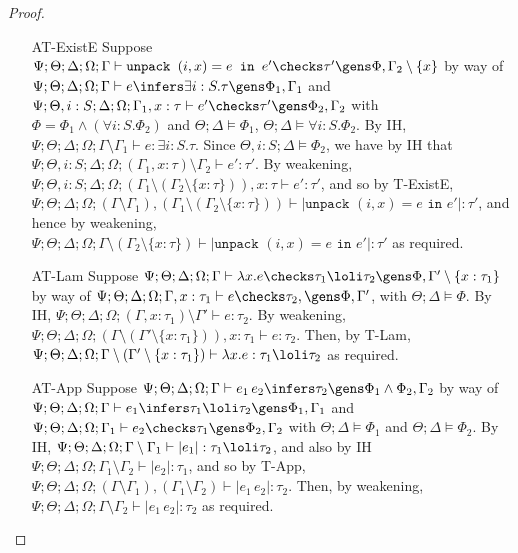 \begin{proof}
\begin{enumerate}
  \item[AT-ExistE] Suppose ${
\Psi ; \Theta ; \Delta ; \Omega ; \Gamma\vdash \texttt{unpack } (i,x) = e \texttt{ in } e' \checks \tau' \gens \Phi , \Gamma_2 \setminus \{x\}
}$ by way of $\Psi ; \Theta ; \Delta ; \Omega ; \Gamma\vdash e \infers \exists i : S.\tau \gens \Phi_1, \Gamma_1$ and $\Psi ; \Theta, i : S ; \Delta ; \Omega ; \Gamma_1, x : \tau \vdash e' \checks \tau' \gens \Phi_2, \Gamma_2$ with $\Phi = \Phi_1 \wedge (\forall i : S. \Phi_2)$ and $\Theta ; \Delta \vDash \Phi_1$, $\Theta ; \Delta \vDash \forall i : S. \Phi_2$. By IH, $\Psi ; \Theta ; \Delta ; \Omega ; \Gamma \setminus \Gamma_1 \vdash e : \exists i : S.\tau$. Since $\Theta, i :S ; \Delta \vDash \Phi_2$, we have by IH that $\Psi ; \Theta, i : S ; \Delta ; \Omega ; (\Gamma_1, x : \tau) \setminus \Gamma_2 \vdash e' : \tau'$. By weakening, $\Psi ; \Theta, i : S ; \Delta ; \Omega ; (\Gamma_1 \setminus (\Gamma_2 \setminus \{x : \tau\})), x : \tau \vdash e' : \tau'$, and so by T-ExistE, $
\Psi ; \Theta ; \Delta ; \Omega ; (\Gamma \setminus \Gamma_1), (\Gamma_1 \setminus (\Gamma_2 \setminus \{x : \tau\})) \vdash |\texttt{unpack } (i,x) = e \texttt{ in } e'| : \tau'$, and hence by weakening, ${
\Psi ; \Theta ; \Delta ; \Omega ; \Gamma \setminus (\Gamma_2 \setminus \{x : \tau\})\vdash |\texttt{unpack } (i,x) = e \texttt{ in } e'| : \tau'
}$ as required.
  \item[AT-Lam] Suppose $\Psi ; \Theta ; \Delta ; \Omega ; \Gamma\vdash \lambda x.e \checks \tau_1 \loli \tau_2 \gens \Phi, \Gamma' \setminus \{x : \tau_1\}$ by way of $\Psi ; \Theta ; \Delta ; \Omega ; \Gamma, x : \tau_1 \vdash e \checks \tau_2, \gens \Phi, \Gamma'$, with $\Theta ; \Delta \vDash \Phi$. By IH, $\Psi ; \Theta ; \Delta ; \Omega ; (\Gamma, x : \tau_1) \setminus \Gamma' \vdash e : \tau_2$. By weakening,  $\Psi ; \Theta ; \Delta ; \Omega ; (\Gamma \setminus (\Gamma' \setminus \{x : \tau_1\})), x : \tau_1 \vdash e : \tau_2$. Then, by T-Lam,  $\Psi ; \Theta ; \Delta ; \Omega ; \Gamma \setminus (\Gamma' \setminus \{x : \tau_1\}) \vdash \lambda x.e : \tau_1 \loli \tau_2$ as required.
  \item[AT-App] Suppose $\Psi ; \Theta ; \Delta ; \Omega ; \Gamma\vdash e_1 \, e_2 \infers  \tau_2 \gens \Phi_1 \wedge \Phi_2, \Gamma_2
$ by way of $\Psi ; \Theta ; \Delta ; \Omega ; \Gamma\vdash e_1 \infers \tau_1 \loli \tau_2 \gens \Phi_1, \Gamma_1$ and $\Psi ; \Theta ; \Delta ; \Omega ; \Gamma_1\vdash e_2 \checks \tau_1 \gens \Phi_2, \Gamma_2$ with $\Theta ; \Delta \vDash \Phi_1$ and $\Theta ; \Delta \vDash \Phi_2$. By IH, $\Psi ; \Theta ; \Delta ; \Omega ; \Gamma \setminus \Gamma_1 \vdash |e_1| : \tau_1 \loli \tau_2$, and also by IH $\Psi ; \Theta ; \Delta ; \Omega ; \Gamma_1 \setminus \Gamma_2 \vdash |e_2| : \tau_1$, and so by T-App, $\Psi ; \Theta ; \Delta ; \Omega ; (\Gamma \setminus \Gamma_1),(\Gamma_1 \setminus \Gamma_2)\vdash |e_1 \, e_2| :  \tau_2$. Then, by weakening,  $\Psi ; \Theta ; \Delta ; \Omega ; \Gamma \setminus \Gamma_2\vdash |e_1 \, e_2| :  \tau_2$ as required.

\end{enumerate}
\end{proof}
